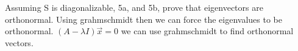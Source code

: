 Assuming S is diagonalizable, 5a, and 5b, prove that eigenvectors are orthonormal. Using grahmschmidt then we can force the eigenvalues to be orthonormal. $(A-\lambda I)\vec{x}=0$ we can use grahmschmidt to find orthonormal vectors.

